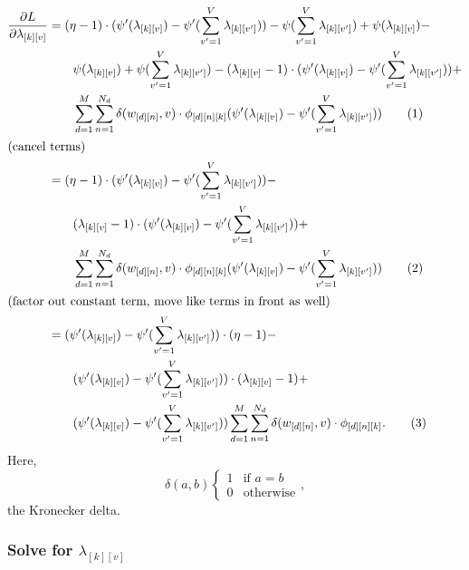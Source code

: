 \documentclass[12pt]{article}
\newcommand\numberthis{\addtocounter{equation}{1}\tag{\theequation}}
\begin{document}
\begin{align*}
    \frac{\partial L}{\partial \lambda_{[k][v]}}
    & =
    (\eta - 1)\cdot(\psi'(\lambda_{[k][v]}) - \psi'(\sum_{v'=1}^{V}
    \lambda_{[k][v']})) - \psi(\sum_{v'=1}^{V}\lambda_{[k][v']}) +
    \psi(\lambda_{[k][v]})-
    \\* &\quad\quad \psi(\lambda_{[k][v]}) + \psi(\sum_{v'=1}^{V}
    \lambda_{[k][v']}) - (\lambda_{[k][v]} - 1) \cdot (\psi'(\lambda_{[k][v]}) -
    \psi'(\sum_{v'=1}^{V} \lambda_{[k][v']})) +
    \\* & \quad\quad \sum_{d=1}^{M} \sum_{n=1}^{N_{d}}
    \delta(w_{[d][n]},v) \cdot \phi_{[d][n][k]} (\psi'(\lambda_{[k][v]}) -
    \psi'(\sum_{v'=1}^{V}\lambda_{[k][v']}))
    \numberthis \\
    \intertext{(cancel terms)}
    & =
    (\eta - 1)\cdot(\psi'(\lambda_{[k][v]}) - \psi'(\sum_{v'=1}^{V}
    \lambda_{[k][v']})) -
    \\* &\quad\quad (\lambda_{[k][v]} - 1) \cdot (\psi'(\lambda_{[k][v]}) -
    \psi'(\sum_{v'=1}^{V} \lambda_{[k][v']})) +
    \\* & \quad\quad \sum_{d=1}^{M} \sum_{n=1}^{N_{d}}
    \delta(w_{[d][n]},v) \cdot \phi_{[d][n][k]} (\psi'(\lambda_{[k][v]}) -
    \psi'(\sum_{v'=1}^{V}\lambda_{[k][v']}))
    \numberthis \\
    \intertext{(factor out constant term, move like terms in front as well)}
    & =
    (\psi'(\lambda_{[k][v]}) - \psi'(\sum_{v'=1}^{V}
    \lambda_{[k][v']})) \cdot (\eta - 1) -
    \\* &\quad\quad (\psi'(\lambda_{[k][v]}) -
    \psi'(\sum_{v'=1}^{V} \lambda_{[k][v']})) \cdot (\lambda_{[k][v]} - 1) +
    \\* & \quad\quad (\psi'(\lambda_{[k][v]}) -
    \psi'(\sum_{v'=1}^{V}\lambda_{[k][v']})) \sum_{d=1}^{M} \sum_{n=1}^{N_{d}}
    \delta(w_{[d][n]},v) \cdot \phi_{[d][n][k]}.
    \numberthis
\end{align*}
Here,
\begin{equation}
    \delta(a,b) \begin{cases} 1 & \text{if } a=b \\ 0 & \text{otherwise}
    \end{cases},
\end{equation}
the Kronecker delta.

\subsubsection{Solve for $\lambda_{[k][v]}$}
\end{document}
